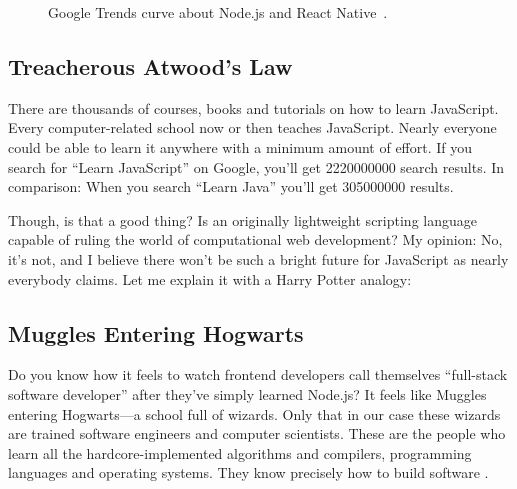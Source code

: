 \documentclass[10pt]{article}  %
\newcommand{\floatcaption}[2]{\caption[#1.]{#1~#2.}}
\begin{document}
\begin{sloppypar}
  \begin{figure}[ht]
    \centering
    \floatcaption{Google Trends curve about Node.js and React Native}{\citep{google_google_nodate}}
    \label{fig:atwood-law}
  \end{figure}

  \subsection{Treacherous Atwood’s Law}
  \label{sec:atwood-law}

  There are thousands of courses, books and tutorials on how to learn JavaScript. Every computer-related school now or then teaches JavaScript. Nearly everyone could be able to learn it anywhere with a minimum amount of effort. If you search for “Learn JavaScript” on Google, you’ll get \num{2220000000} search results. In comparison: When you search “Learn Java” you’ll get \num{305000000} results.

  Though, is that a good thing? Is an originally lightweight scripting language capable of ruling the world of computational web development? My opinion: No, it’s not, and I believe there won’t be such a bright future for JavaScript as nearly everybody claims. Let me explain it with a Harry Potter analogy:

  \subsection{Muggles Entering Hogwarts}
  \label{sec:muggles}

  Do you know how it feels to watch frontend developers call themselves “full-stack software developer” after they’ve simply learned Node.js? It feels like Muggles entering Hogwarts—a school full of wizards. Only that in our case these wizards are trained software engineers and computer scientists. These are the people who learn all the hardcore-implemented algorithms and compilers, programming languages and operating systems. They know precisely how to build software \citep{might_what_2011}.


\end{sloppypar}
\end{document}

